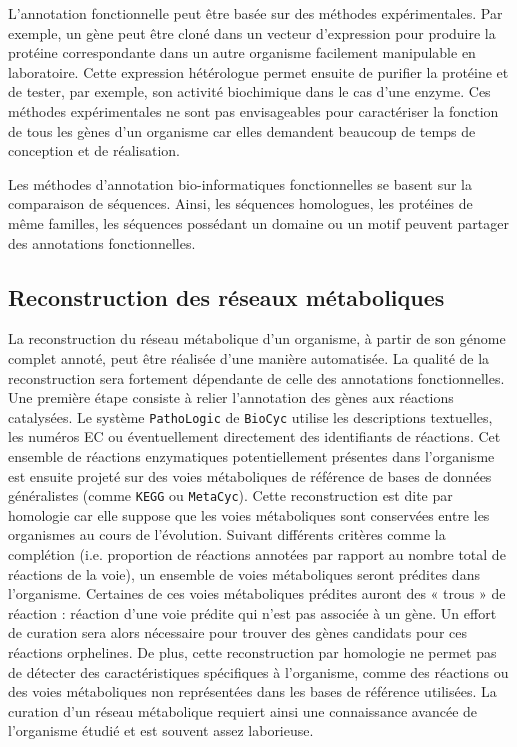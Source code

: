 \begin{refsegment}
    L’annotation fonctionnelle peut être basée sur des méthodes expérimentales. Par exemple, un gène peut être cloné dans un vecteur d’expression pour produire la protéine correspondante dans un autre organisme facilement manipulable en laboratoire. Cette expression hétérologue permet ensuite de purifier la protéine et de tester, par exemple, son activité biochimique dans le cas d’une enzyme. Ces méthodes expérimentales ne sont  pas envisageables pour caractériser la fonction de tous les gènes  d’un organisme car elles demandent beaucoup de temps de conception et de réalisation.
    
    Les méthodes d’annotation bio-informatiques fonctionnelles se basent sur la comparaison de séquences. Ainsi, les séquences homologues, les protéines de même familles, les séquences possédant un domaine ou un motif peuvent partager des annotations fonctionnelles.
    
    \subsection{Reconstruction des réseaux métaboliques}
    
    La reconstruction du réseau métabolique d’un organisme, à partir de son génome complet annoté, peut être réalisée d’une manière automatisée. La qualité de la reconstruction sera fortement dépendante de celle des annotations fonctionnelles. Une première étape consiste à relier l’annotation des gènes aux réactions catalysées. Le système \texttt{PathoLogic} de \texttt{BioCyc} utilise les descriptions textuelles, les numéros \gls{EC} ou éventuellement directement des identifiants de réactions.  Cet ensemble de réactions enzymatiques potentiellement présentes dans l’organisme est ensuite projeté sur des voies métaboliques de référence de bases de données généralistes (comme \texttt{KEGG} ou \texttt{MetaCyc}). Cette reconstruction est dite par homologie car elle suppose que les voies métaboliques sont conservées entre les organismes au cours de l’évolution. Suivant différents critères comme la complétion (i.e. proportion de réactions annotées par rapport au nombre total de réactions de la voie), un ensemble de voies métaboliques seront prédites  dans l’organisme. 
    Certaines de ces voies métaboliques prédites auront des « trous » de réaction : réaction d’une voie prédite qui n’est pas associée à un gène.  Un effort de curation sera alors nécessaire pour trouver des gènes candidats pour ces réactions orphelines. De plus,  cette reconstruction par homologie ne permet pas de détecter des caractéristiques spécifiques à l'organisme, comme des réactions ou des voies métaboliques non représentées dans les bases de référence utilisées. La curation d’un réseau métabolique requiert ainsi une connaissance avancée de l’organisme étudié et est souvent assez laborieuse. 
    

\end{refsegment}
